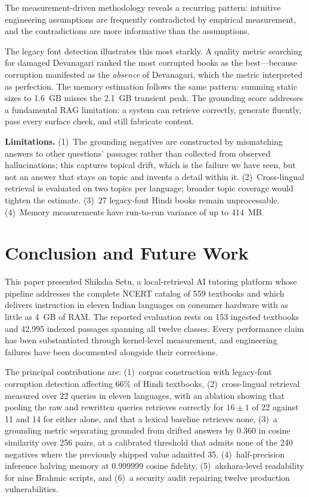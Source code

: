 \documentclass[conference]{IEEEtran}
\begin{document}
The measurement-driven methodology reveals a recurring pattern: intuitive engineering assumptions are frequently contradicted by empirical measurement, and the contradictions are more informative than the assumptions.

The legacy font detection illustrates this most starkly. A quality metric searching for damaged Devanagari ranked the most corrupted books as the best---because corruption manifested as the \textit{absence} of Devanagari, which the metric interpreted as perfection. The memory estimation follows the same pattern: summing static sizes to 1.6~GB misses the 2.1~GB transient peak. The grounding score addresses a fundamental RAG limitation: a system can retrieve correctly, generate fluently, pass every surface check, and still fabricate content.

\textbf{Limitations.} (1)~The grounding negatives are constructed by mismatching answers to other questions' passages rather than collected from observed hallucinations; this captures topical drift, which is the failure we have seen, but not an answer that stays on topic and invents a detail within it. (2)~Cross-lingual retrieval is evaluated on two topics per language; broader topic coverage would tighten the estimate. (3)~27 legacy-font Hindi books remain unprocessable. (4)~Memory measurements have run-to-run variance of up to 414~MB.

\section{Conclusion and Future Work}

This paper presented Shiksha Setu, a local-retrieval AI tutoring platform whose pipeline addresses the complete NCERT catalog of 559 textbooks and which delivers instruction in eleven Indian languages on consumer hardware with as little as 4~GB of RAM. The reported evaluation rests on 153 ingested textbooks and 42{,}995 indexed passages spanning all twelve classes. Every performance claim has been substantiated through kernel-level measurement, and engineering failures have been documented alongside their corrections.

The principal contributions are: (1)~corpus construction with legacy-font corruption detection affecting 66\% of Hindi textbooks, (2)~cross-lingual retrieval measured over 22 queries in eleven languages, with an ablation showing that pooling the raw and rewritten queries retrieves correctly for $16\pm1$ of 22 against 11 and 14 for either alone, and that a lexical baseline retrieves none, (3)~a grounding metric separating grounded from drifted answers by 0.360 in cosine similarity over 256 pairs, at a calibrated threshold that admits none of the 240 negatives where the previously shipped value admitted 35, (4)~half-precision inference halving memory at 0.999999 cosine fidelity, (5)~akshara-level readability for nine Brahmic scripts, and (6)~a security audit repairing twelve production vulnerabilities.
\end{document}
